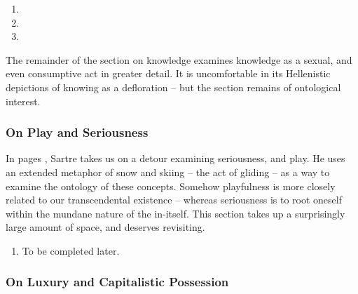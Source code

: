 \begin{enumerate}
  \item {}
  \item {}
  \item {}
\end{enumerate}

\noindent
The remainder of the section on knowledge \autocite[750 -- 752]{sartre} examines knowledge as a sexual, and even consumptive act in greater detail. It is uncomfortable in its Hellenistic depictions of knowing as a defloration -- but the section remains of ontological interest.

\subsubsection{On Play and Seriousness}

In pages \autocite[752 -- 760]{sartre}, Sartre takes us on a detour examining seriousness, and play. He uses an extended metaphor of snow and skiing -- the act of gliding -- as a way to examine the ontology of these concepts. Somehow playfulness is more closely related to our transcendental existence -- whereas seriousness is to root oneself within the mundane nature of the in-itself. This section takes up a surprisingly large amount of space, and deserves revisiting.

\begin{enumerate}
  \item To be completed later.
\end{enumerate}

\subsubsection{On Luxury and Capitalistic Possession}

